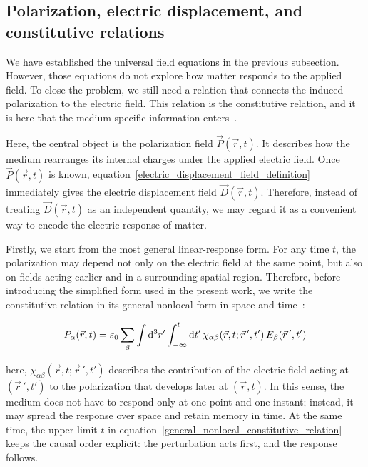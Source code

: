 \subsection{Polarization, electric displacement, and constitutive relations}

We have established the universal field equations in the previous subsection.
However, those equations do not explore how matter responds to the applied field.
To close the problem, we still need a relation that connects the induced polarization to the electric field.
This relation is the constitutive relation, and it is here that the medium-specific information enters~\cite{landau2013electrodynamics, lima2022usefulness}.

Here, the central object is the polarization field $\vec{P}(\vec{r},t)$.
It describes how the medium rearranges its internal charges under the applied electric field.
Once $\vec{P}(\vec{r},t)$ is known, equation~\eqref{electric_displacement_field_definition} immediately gives the electric displacement field $\vec{D}(\vec{r},t)$.
Therefore, instead of treating $\vec{D}(\vec{r},t)$ as an independent quantity, we may regard it as a convenient way to encode the electric response of matter.

Firstly, we start from the most general linear-response form.
For any time $t$, the polarization may depend not only on the electric field at the same point,
but also on fields acting earlier and in a surrounding spatial region.
Therefore, before introducing the simplified form used in the present work,
we write the constitutive relation in its general nonlocal form in space and time~\cite{royo2019first}:

\begin{equation}
    P_\alpha(\vec{r},t) =
    \varepsilon_0\sum_\beta\int\mathrm{d}^3{r'}
    \int_{-\infty}^{t}\mathrm{d}{t'}
    \,\chi_{\alpha\beta}(\vec{r},t;\vec{r}\,',t')\,E_\beta(\vec{r}\,',t')
\label{general_nonlocal_constitutive_relation}
\end{equation}

here, $\chi_{\alpha\beta}(\vec{r},t;\vec{r}\,',t')$ describes the contribution of the electric field acting at $(\vec{r}\,',t')$ to the polarization that develops later at $(\vec{r},t)$.
In this sense, the medium does not have to respond only at one point and one instant;
instead, it may spread the response over space and retain memory in time.
At the same time, the upper limit $t$ in equation~\eqref{general_nonlocal_constitutive_relation} keeps the causal order explicit: the perturbation acts first, and the response follows.

